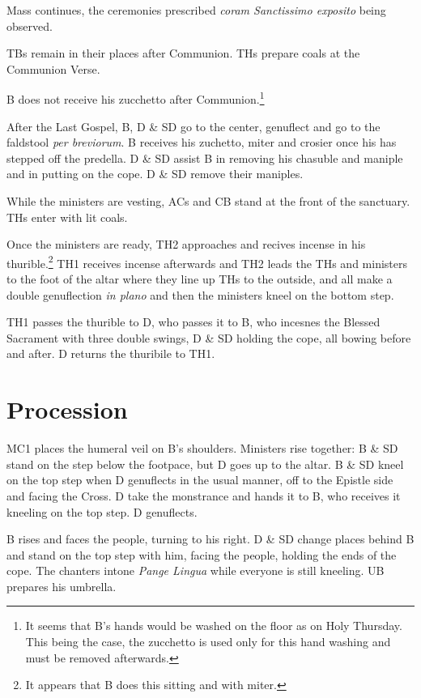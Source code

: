 \documentclass[letterpaper]{report}
\newcommand{\pbr}[0]{\textit{per breviorum}}
\begin{document}
{\rubric Mass continues, the ceremonies prescribed \textit{coram Sanctissimo
exposito} being observed.

\rubric TBs remain in their places after Communion. THs prepare coals at the
Communion Verse.

\rubric B does not receive his zucchetto after Communion.\footnote{It seems
that B's hands would be washed on the floor as on Holy Thursday. This being the
case, the zucchetto is used only for this hand washing and must be removed
afterwards.}

\rubric After the Last Gospel, B, D \& SD go to the center, genuflect and go to
the faldstool \pbr. B receives his zuchetto, miter and crosier once his has
stepped off the predella. D \& SD assist B in removing his chasuble and maniple
and in putting on the cope. D \& SD remove their maniples.

\rubric While the ministers are vesting, ACs and CB stand at the front of the
sanctuary. THs enter with lit coals.

\rubric Once the ministers are ready, TH2 approaches and recives incense in his
thurible.\footnote{It appears that B does this sitting and with miter.} TH1
receives incense afterwards and TH2 leads the THs and ministers to the foot of
the altar where they line up THs to the outside, and all make a double
genuflection \textit{in plano} and then the ministers kneel on the bottom step.

\rubric TH1 passes the thurible to D, who passes it to B, who incesnes the
Blessed Sacrament with three double swings, D \& SD holding the cope, all
bowing before and after. D returns the thuribile to TH1.

\section{Procession}

\rubric MC1 places the humeral veil on B's shoulders. Ministers rise together:
B \& SD stand on the step below the footpace, but D goes up to the altar. B \&
SD kneel on the top step when D genuflects in the usual manner, off to the
Epistle side and facing the Cross. D take the monstrance and hands it to B, who
receives it kneeling on the top step. D genuflects.

\rubric B rises and faces the people, turning to his right. D \& SD change
places behind B and stand on the top step with him, facing the people, holding
the ends of the cope. The chanters intone \textit{Pange Lingua} while everyone
is still kneeling. UB prepares his umbrella.

}
\end{document}
